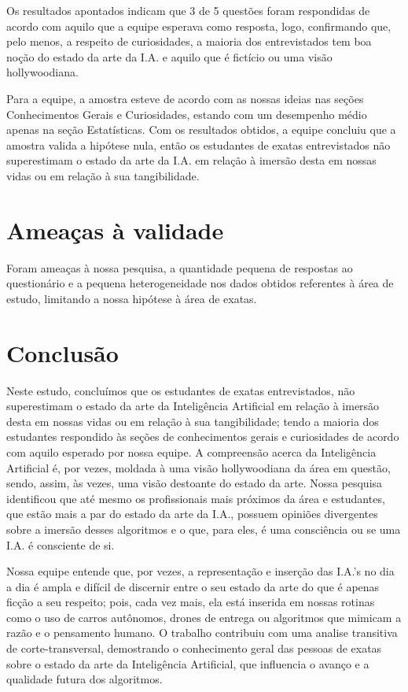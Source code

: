 \documentclass[onecolumn,12pt]{asme2ej}
\begin{document}
Os resultados apontados indicam que 3 de 5 questões foram respondidas de acordo com aquilo que a equipe esperava como resposta, logo, confirmando que, pelo menos, a respeito de curiosidades, a maioria dos entrevistados tem boa noção do estado da arte da I.A. e aquilo que é fictício ou uma visão hollywoodiana.

Para a equipe, a amostra esteve de acordo com as nossas ideias nas seções Conhecimentos Gerais e Curiosidades, estando com um desempenho médio apenas na seção Estatísticas. Com os resultados obtidos, a equipe concluiu que a amostra valida a hipótese nula, então os estudantes de exatas entrevistados não superestimam o estado da arte da I.A. em relação à imersão desta em nossas vidas ou em relação à sua tangibilidade.

\section{Ameaças à validade} 

Foram ameaças à nossa pesquisa, a quantidade pequena de respostas ao questionário e a pequena heterogeneidade nos dados obtidos referentes à área de estudo, limitando a nossa hipótese à área de exatas.

\section{Conclusão} 

Neste estudo, concluímos que os estudantes de exatas entrevistados, não superestimam o estado da arte da Inteligência Artificial em relação à imersão desta em nossas vidas ou em relação à sua tangibilidade; tendo a maioria dos estudantes respondido às seções de conhecimentos gerais e curiosidades de acordo com aquilo esperado por nossa equipe. A compreensão acerca da Inteligência Artificial é, por vezes, moldada à uma visão hollywoodiana da área em questão, sendo, assim, às vezes, uma visão destoante do estado da arte. Nossa pesquisa identificou que até mesmo os profissionais mais próximos da área e estudantes, que estão mais a par do estado da arte da I.A., possuem opiniões divergentes sobre a imersão desses algoritmos e o que, para eles, é uma consciência ou se uma I.A. é consciente de si. 

Nossa equipe entende que, por vezes, a representação e inserção das I.A.'s no dia a dia é ampla e difícil de discernir entre o seu estado da arte do que é apenas ficção a seu respeito; pois, cada vez mais, ela está inserida em nossas rotinas como o uso de carros autônomos, drones de entrega ou algoritmos que mimicam a razão e o pensamento humano. O trabalho contribuiu com uma analise transitiva de corte-transversal, demostrando o conhecimento geral das pessoas de exatas sobre o estado da arte da Inteligência Artificial, que influencia o avanço e a qualidade futura dos algoritmos.

\printbibliography
\end{document}
